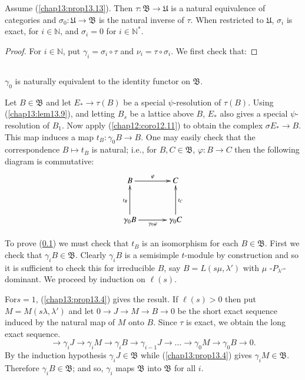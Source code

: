 \begin{prop}\label{chap13:prop13.13}
Assume (\ref{chap13:prop13.13}). Then $\tau : \mathfrak{B} \to \mathfrak{U}$ is a
natural equivalence of categories and $\sigma_0 : \mathfrak{U} \to
\mathfrak{B}$ is the natural inverse of $\tau$. When restricted to
$\mathfrak{U}$, $\sigma_i$ is exact, for $i \in \mathbb{N}$, and
$\sigma_i = 0$ for $i \in \mathbb{N}^*$. 
\end{prop}

\begin{proof}
For $i \in \mathbb{N}$, put $\gamma_i = \sigma_i \circ \tau$ and
$\nu_i = \tau \circ \sigma_i$. We first check that:
\end{proof}

\setcounter{subsection}{13}
\subsection{}\label{chap13:subsec13.14}
$\gamma_0$ is naturally equivalent to the identity functor on
$\mathfrak{B}$. 


Let $B\in \mathfrak{B}$ and let $E_* \to \tau(B)$ be a special
$\psi$-resolution of $\tau (B)$. Using (\ref{chap13:lem13.9}), and letting $B_s$ be a
lattice above $B$, $E_*$ also gives a special $\psi$-resolution of
$B_1$. Now apply (\ref{chap12:coro12.11}) to obtain the complex $\sigma E_* \to
B$. This map induces a map $t_B: \gamma_0 B \to B$. One may easily
check that the correspondence $B \mapsto t_B$ is natural; i.e., for
$B, C \in \mathfrak{B}$, $\varphi: B \to C$ then the following diagram
is commutative: 
$$
\xymatrix@R=1.2cm@C=1.2cm{
B \ar[r]^\varphi & C \\
\gamma_0 B \ar[r]_{\gamma_0 \varphi} \ar[u]^{t_B} & \gamma_0
C\ar[u]_{t_C} 
}
$$

To prove (\ref{chap13:subsec13.14}) we must check that $t_B$ is an isomorphism for each
$B \in \mathfrak{B}$. First we check that $\gamma_i B \in
\mathfrak{B}$. Clearly $\gamma_i B$ is a semisimple $t$-module by
construction and so it is sufficient to check this for irreducible
$B$, say $B = L (s\mu, \lambda')$ with $\mu$
-$P_{\lambda'}$-dominant. We proceed by induction on $\ell(s)$. 

For\pageoriginale $s =1$, (\ref{chap13:prop13.4}) gives the result. If $\ell(s) > 0$
then put $M = M (s\lambda, \lambda')$ and let $0 \to J \to M \to B \to
0$ be the short exact sequence induced by the natural map of $M$ onto
$B$. Since $\tau$ is exact, we obtain the long exact sequence. 
$$
 \to \gamma_i J \to \gamma_i M \to \gamma_i B \to \gamma_{i-1} J \to
 \ldots \to \gamma_0 M \to \gamma_0 B \to 0. 
$$
By the induction hypothesis $\gamma_i J \in \mathfrak{B}$ while (\ref{chap13:prop13.4})
gives $\gamma_i M \in \mathfrak{B}$. Therefore $\gamma_i B \in
\mathfrak{B}$; and so, $\gamma_i $ maps $\mathfrak{B}$ into
$\mathfrak{B}$ for all $i$. 

